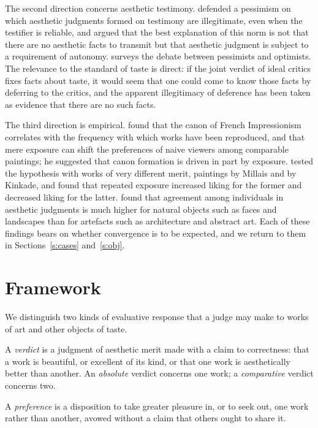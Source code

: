 \documentclass{situationist-preprint}
\begin{document}
The second direction concerns aesthetic testimony. \citet{Hopkins2011} defended a pessimism on which aesthetic judgments formed on testimony are illegitimate, even when the testifier is reliable, and argued that the best explanation of this norm is not that there are no aesthetic facts to transmit but that aesthetic judgment is subject to a requirement of autonomy. \citet{Robson2012} surveys the debate between pessimists and optimists. The relevance to the standard of taste is direct: if the joint verdict of ideal critics fixes facts about taste, it would seem that one could come to know those facts by deferring to the critics, and the apparent illegitimacy of deference has been taken as evidence that there are no such facts.

The third direction is empirical. \citet{Cutting2003} found that the canon of French Impressionism correlates with the frequency with which works have been reproduced, and that mere exposure can shift the preferences of naive viewers among comparable paintings; he suggested that canon formation is driven in part by exposure. \citet{Meskin2013} tested the hypothesis with works of very different merit, paintings by Millais and by Kinkade, and found that repeated exposure increased liking for the former and decreased liking for the latter. \citet{Vessel2018} found that agreement among individuals in aesthetic judgments is much higher for natural objects such as faces and landscapes than for artefacts such as architecture and abstract art. Each of these findings bears on whether convergence is to be expected, and we return to them in Sections~\ref{s:cases} and~\ref{s:obj}.

\section{Framework}\label{s:frame}

We distinguish two kinds of evaluative response that a judge may make to works of art and other objects of taste.

\begin{definition}[Verdict]\label{d:verdict}
A \emph{verdict} is a judgment of aesthetic merit made with a claim to correctness: that a work is beautiful, or excellent of its kind, or that one work is aesthetically better than another. An \emph{absolute} verdict concerns one work; a \emph{comparative} verdict concerns two.
\end{definition}

\begin{definition}[Preference]\label{d:pref}
A \emph{preference} is a disposition to take greater pleasure in, or to seek out, one work rather than another, avowed without a claim that others ought to share it.
\end{definition}
\end{document}
